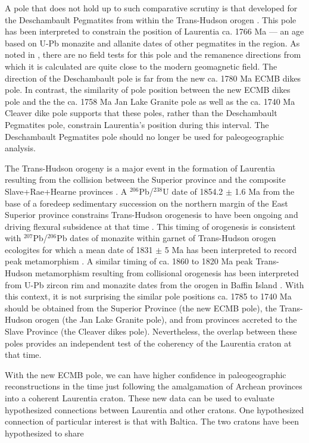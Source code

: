 \documentclass[draft]{agujournal2019}
\begin{document}
A pole that does not hold up to such comparative scrutiny is that developed for the Deschambault Pegmatites from within the Trans-Hudson orogen \cite{Symons2000a}. This pole has been interpreted to constrain the position of Laurentia ca. 1766 Ma --- an age based on U-Pb monazite and allanite dates of other pegmatites in the region. As noted in \cite{DAgrella-Filho2020a}, there are no field tests for this pole and the remanence directions from which it is calculated are quite close to the modern geomagnetic field. The direction of the Deschambault pole is far from the new ca. 1780 Ma ECMB dikes pole. In contrast, the similarity of pole position between the new ECMB dikes pole and the the ca. 1758 Ma Jan Lake Granite pole as well as the ca. 1740 Ma Cleaver dike pole supports that these poles, rather than the Deschambault Pegmatites pole, constrain Laurentia's position during this interval. The Deschambault Pegmatites pole should no longer be used for paleogeographic analysis. 

The Trans-Hudson orogeny is a major event in the formation of Laurentia resulting from the collision between the Superior province and the composite Slave+Rae+Hearne provinces \cite{Corrigan2009a}. A $^{206}$Pb/$^{238}$U date of 1854.2 $\pm$ 1.6 Ma from the base of a foredeep sedimentary succession on the northern margin of the East Superior province constrains Trans-Hudson orogenesis to have been ongoing and driving flexural subsidence at that time \cite{Hodgskiss2019a}. This timing of orogenesis is consistent with $^{207}$Pb/$^{206}$Pb dates of monazite within garnet of Trans-Hudson orogen ecologites for which a mean date of 1831 $\pm$ 5 Ma has been interpreted to record peak metamorphism \cite{Weller2017a}. A similar timing of ca. 1860 to 1820 Ma peak Trans-Hudson metamorphism resulting from collisional orogenesis has been interpreted from U-Pb zircon rim and monazite dates from the orogen in Baffin Island \cite{Skipton2016a}. With this context, it is not surprising the similar pole positions ca. 1785 to 1740 Ma should be obtained from the Superior Province (the new ECMB pole), the Trans-Hudson orogen (the Jan Lake Granite pole), and from provinces accreted to the Slave Province (the Cleaver dikes pole). Nevertheless, the overlap between these poles provides an independent test of the coherency of the Laurentia craton at that time. 

With the new ECMB pole, we can have higher confidence in paleogeographic reconstructions in the time just following the amalgamation of Archean provinces into a coherent Laurentia craton. These new data can be used to evaluate hypothesized connections between Laurentia and other cratons. One hypothesized connection of particular interest is that with Baltica. The two cratons have been hypothesized to share 
\end{document}
